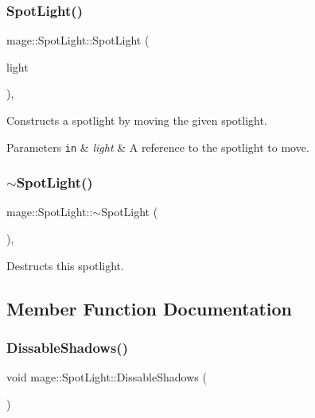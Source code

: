 \subsubsection{\texorpdfstring{Spot\+Light()}{SpotLight()}\hspace{0.1cm}{\footnotesize\ttfamily [3/3]}}
{\footnotesize\ttfamily mage\+::\+Spot\+Light\+::\+Spot\+Light (\begin{DoxyParamCaption}\item[{\hyperlink{classmage_1_1_spot_light}{Spot\+Light} \&\&}]{light }\end{DoxyParamCaption})\hspace{0.3cm}{\ttfamily [default]}, {\ttfamily [noexcept]}}

Constructs a spotlight by moving the given spotlight.


\begin{DoxyParams}[1]{Parameters}
\mbox{\tt in}  & {\em light} & A reference to the spotlight to move. \\
\hline
\end{DoxyParams}
\hypertarget{classmage_1_1_spot_light_aeeaba91c6448102ac6a23587c5366808}{}\label{classmage_1_1_spot_light_aeeaba91c6448102ac6a23587c5366808} 
\subsubsection{\texorpdfstring{$\sim$\+Spot\+Light()}{~SpotLight()}}
{\footnotesize\ttfamily mage\+::\+Spot\+Light\+::$\sim$\+Spot\+Light (\begin{DoxyParamCaption}{ }\end{DoxyParamCaption})\hspace{0.3cm}{\ttfamily [virtual]}, {\ttfamily [default]}}

Destructs this spotlight. 

\subsection{Member Function Documentation}
\hypertarget{classmage_1_1_spot_light_ae43668c2ae4c041b8abf822e15ab2185}{}\label{classmage_1_1_spot_light_ae43668c2ae4c041b8abf822e15ab2185} 
\subsubsection{\texorpdfstring{Dissable\+Shadows()}{DissableShadows()}}
{\footnotesize\ttfamily void mage\+::\+Spot\+Light\+::\+Dissable\+Shadows (\begin{DoxyParamCaption}{ }\end{DoxyParamCaption})\hspace{0.3cm}{\ttfamily [noexcept]}}

